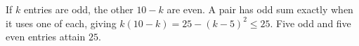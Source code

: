 If $k$ entries are odd, the other $10-k$ are even. A pair has odd sum exactly when it uses one of each, giving $k(10-k)=25-(k-5)^2\le25$. Five odd and five even entries attain $\boxed{25}$.

